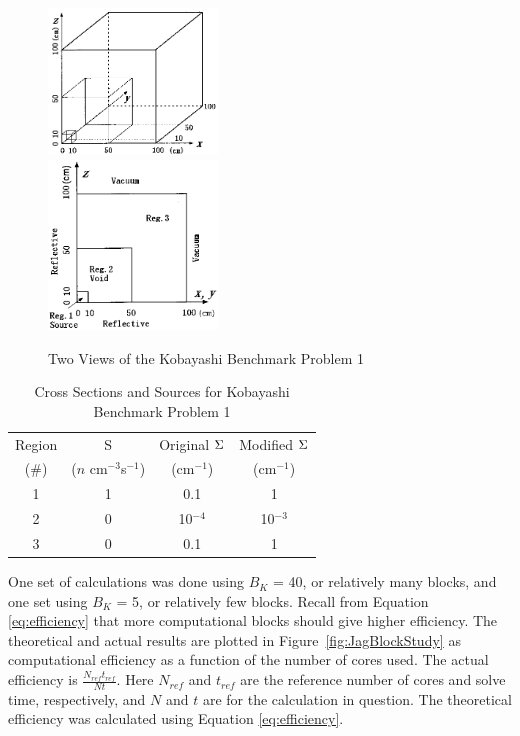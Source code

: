 \begin{figure}[!ht]	
  \begin{center}
    \includegraphics [width=0.4\textwidth, height=0.3\textheight ] {Kobayashi1} \\
    \includegraphics [width=0.4\textwidth, height=0.3\textheight ] {Kobayashi1Front}
  \end{center}
  \caption{Two Views of the Kobayashi Benchmark Problem 1}
  \label{fig:Kob1}
\end{figure}

\begin{table}[h]
  \caption{Cross Sections and Sources for Kobayashi Benchmark Problem 1}
  \centering
  \begin{tabular}{|c|c|c|c|}
    \hline
    Region & S & Original $\Sigma$ & Modified $\Sigma$ \\
    (\#) & ($n$ cm$^{-3}$s$^{-1}$) & (cm$^{-1}$) & (cm$^{-1}$) \\
    \hline
    1 & 1 & 0.1 & 1 \\
    2 & 0 & 10$^{-4}$ & 10$^{-3}$ \\
    3 & 0 & 0.1 & 1 \\
    \hline
  \end{tabular}
  \label{tab:Kob1xsecs}
\end{table}

One set of calculations was done using $B_{K}$ = 40, or relatively many blocks, and one set using $B_{K}$ = 5, or relatively few blocks. Recall from Equation \eqref{eq:efficiency} that more computational blocks should give higher efficiency. The theoretical and actual results are plotted in Figure~\ref{fig:JagBlockStudy} as computational efficiency as a function of the number of cores used. The actual efficiency is $\frac{N_{ref}t_{ref}}{Nt}$. Here $N_{ref}$ and $t_{ref}$ are the reference number of cores and solve time, respectively, and $N$ and $t$ are for the calculation in question.  The theoretical efficiency was calculated using Equation \eqref{eq:efficiency}.

